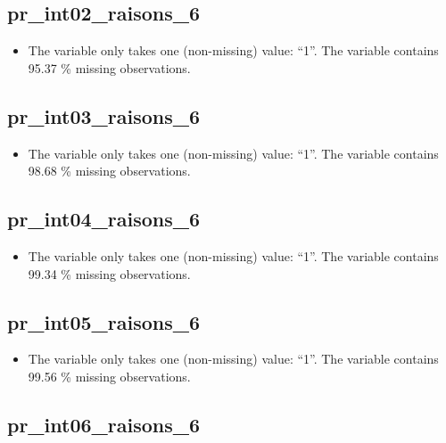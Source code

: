 \documentclass[
  letterpaper,
  DIV=11,
  numbers=noendperiod]{scrartcl}
\providecommand{\tightlist}{%
  \setlength{\itemsep}{0pt}\setlength{\parskip}{0pt}}
\begin{document}
\fullline

\subsection{pr\_int02\_raisons\_6}\label{pr_int02_raisons_6}

\begin{itemize}
\tightlist
\item
  The variable only takes one (non-missing) value: ``1''. The variable
  contains 95.37 \% missing observations.
\end{itemize}

\fullline

\subsection{pr\_int03\_raisons\_6}\label{pr_int03_raisons_6}

\begin{itemize}
\tightlist
\item
  The variable only takes one (non-missing) value: ``1''. The variable
  contains 98.68 \% missing observations.
\end{itemize}

\fullline

\subsection{pr\_int04\_raisons\_6}\label{pr_int04_raisons_6}

\begin{itemize}
\tightlist
\item
  The variable only takes one (non-missing) value: ``1''. The variable
  contains 99.34 \% missing observations.
\end{itemize}

\fullline

\subsection{pr\_int05\_raisons\_6}\label{pr_int05_raisons_6}

\begin{itemize}
\tightlist
\item
  The variable only takes one (non-missing) value: ``1''. The variable
  contains 99.56 \% missing observations.
\end{itemize}

\fullline

\subsection{pr\_int06\_raisons\_6}\label{pr_int06_raisons_6}
\end{document}
